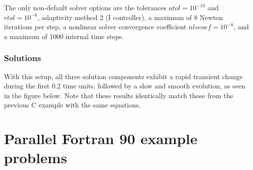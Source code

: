 \documentclass[letterpaper,10pt,english]{sphinxmanual}
\begin{document}
The only non-default solver options are the tolerances
$atol=10^{-10}$ and $rtol=10^{-6}$, adaptivity method 2 (I
controller), a maximum of 8 Newton iterations per step, a nonlinear
solver convergence coefficient $nlscoef=10^{-8}$, and a maximum
of 1000 internal time steps.


\subsection{Solutions}
\label{f90_serial:solutions}
With this setup, all three solution components exhibit a rapid
transient change during the first 0.2 time units, followed by a slow
and smooth evolution, as seen in the figure below.  Note that these
results identically match those from the previous C example with the
same equations.
\begin{figure}[htbp]
\centering

\end{figure}


\chapter{Parallel Fortran 90 example problems}
\label{f90_parallel:parallel-fortran-90-example-problems}\label{f90_parallel::doc}\label{f90_parallel:parallel-f90}
\end{document}

